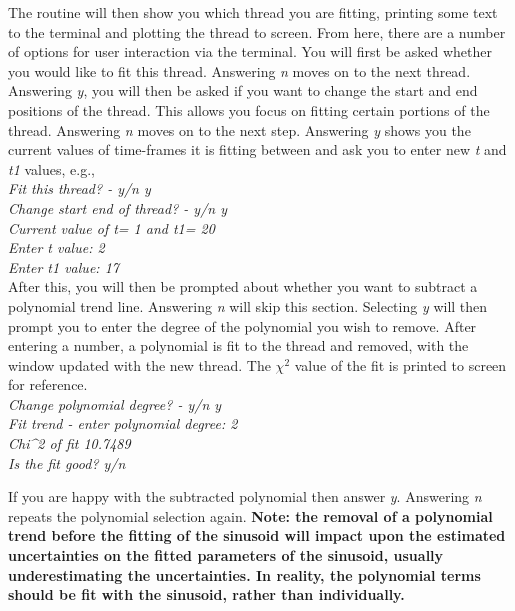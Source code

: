 \documentclass{article}
\begin{document}
The routine will then show you which thread you are fitting, printing some text to the terminal and plotting the thread to screen. From here, there are a number of options 
for user interaction via the terminal. You will first be asked whether you would like to fit this thread. Answering \textit{n} moves on to the next thread.  Answering \textit{y},
you will then be asked if you want to change the start and end positions of the thread. This allows you focus on fitting certain portions of the thread. Answering \textit{n} moves on to the next step. Answering \textit{y} shows you the current values of time-frames it is fitting between and ask you to enter new \textit{t} and \textit{t1} values, e.g., \\

\textit{Fit this thread? - y/n y\\
Change start end of thread? - y/n y\\
Current value of t=           1 and t1=          20\\
Enter t value: 2\\
Enter t1 value: 17 }\\
 
After this, you will then be prompted about whether you want to subtract a polynomial trend line. Answering \textit{n} will skip this section. Selecting \textit{y} will then 
prompt you to enter the degree of the polynomial you wish to remove. After entering a number, a polynomial is fit to the thread and removed, with the window updated with 
the new thread. The $\chi^2$ value of the fit is printed to screen for reference.\\
 
\textit{Change polynomial degree? - y/n y\\
Fit trend - enter polynomial degree: 2\\
Chi\^{}2 of fit       10.7489\\
Is the fit good? y/n \\}

If you are happy with the subtracted polynomial then answer \textit{y}. Answering \textit{n} repeats the polynomial selection again. \textbf{Note: the removal of a polynomial 
trend before the fitting of the sinusoid will impact upon the estimated uncertainties on the fitted parameters of the sinusoid, usually underestimating the uncertainties. In 
reality, the polynomial terms should be fit with the sinusoid, rather than individually.}\\
\end{document}
